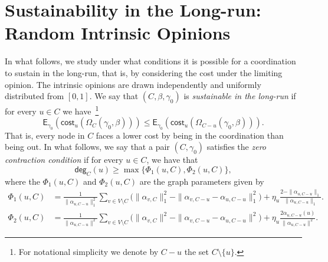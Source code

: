 \documentclass[letterpaper,11pt]{article}
\newcommand{\EE}{\mathsf{E}}
\newcommand{\cost}{\mathsf{cost}}
\newcommand{\degsf}{\mathsf{deg}}
\newcommand{\vvcom}[1]{\todo[color=red!25!white]{Victor: #1}}
\begin{document}
\section{Sustainability in the Long-run: Random Intrinsic Opinions}

In what follows, we study under what conditions it is possible for a coordination to sustain in the long-run, that is, by considering the cost under the limiting opinion.
The intrinsic opinions are drawn independently and uniformly distributed from $[0,1]$.
We say that $(C,\beta,\gamma_0)$ is {\it sustainable in the long-run} if for every $u\in C$ we have~\footnote{For notational simplicity we denote by $C-u$ the set $C\setminus \{u\}$.} 
\begin{equation*}
\EE_{\gamma_0}(\cost_u(\Omega_C(\gamma_0,\beta)))\le \EE_{\gamma_0}(\cost_u(\Omega_{C-u}(\gamma_0,\beta))).
\end{equation*}
That is, every node in $C$ faces a lower cost by being in the coordination than being out.
In what follows, we say that a pair $(C,\gamma_0)$ satisfies the {\it zero contraction condition} if for every $u\in C$, we have that 
\begin{equation*}
\degsf_C(u)\ge \max\Big\{\Phi_1(u,C),\Phi_2(u,C)\Big\},
\end{equation*}
where the $\Phi_1(u,C)$ and $\Phi_2(u,C)$ are the graph parameters given by 
\begin{align*}
\Phi_1(u,C)&=\frac{1}{\|\alpha_{u,C-u}\|_1^2}\sum_{v\in V\setminus C}\Big(\|\alpha_{v,C}\|_1^2-\|\alpha_{v,C-u}-\alpha_{u,C-u}\|_1^2\Big)+\eta_u\frac{2-\|\alpha_{u,C-u}\|_1}{\|\alpha_{u,C-u}\|_1}.\\
\Phi_2(u,C)&=\frac{1}{\|\alpha_{u,C-u}\|^2}\sum_{v\in V\setminus C}\Big(\|\alpha_{v,C}\|^2-\|\alpha_{v,C-u}-\alpha_{u,C-u}\|^2\Big)+\eta_u\frac{2\alpha_{u,C-u}(u)}{\|\alpha_{u,C-u}\|^2}.
\end{align*}
\end{document}
